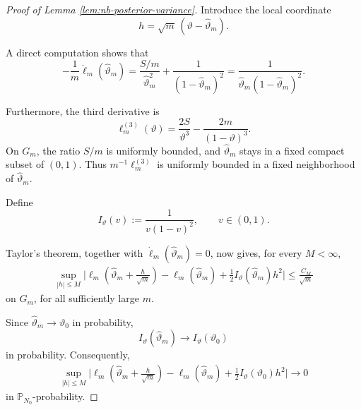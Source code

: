 \documentclass{article}
\theoremstyle{named}
\theoremstyle{named1}
\theoremstyle{plain}
\theoremstyle{remark}
\begin{document}
\begin{proof}[Proof of Lemma \ref{lem:nb-posterior-variance}]
Introduce the local coordinate
\[
    h=\sqrt m\,(\vartheta-\widehat\vartheta_m).
\]

A direct computation shows that
\begin{equation}
    -\frac1m\ddot\ell_m(\widehat\vartheta_m)
    =
    \frac{S/m}{\widehat\vartheta_m^2}
    +
    \frac{1}{(1-\widehat\vartheta_m)^2}
    =
    \frac{1}
    {\widehat\vartheta_m(1-\widehat\vartheta_m)^2}.
    \label{eq:nb-proof-observed-information}
\end{equation}


Furthermore, the third derivative is
\[
    \ell_m^{(3)}(\vartheta)
    =
    \frac{2S}{\vartheta^3}
    -
    \frac{2m}{(1-\vartheta)^3}.
\]
On \(G_m\), the ratio \(S/m\) is uniformly bounded, and
\(\widehat\vartheta_m\) stays in a fixed compact subset of
\((0,1)\). Thus \(m^{-1}\ell_m^{(3)}\) is uniformly bounded in a
fixed neighborhood of \(\widehat\vartheta_m\).

Define
\[
    I_\vartheta(v)
    :=
    \frac{1}{v(1-v)^2},
    \qquad v\in(0,1).
\]

Taylor's theorem, together with
\(\dot\ell_m(\widehat\vartheta_m)=0\), now gives, for every
\(M<\infty\),
\begin{equation}
\begin{split}
    \sup_{|h|\leq M}
    \bigg|
        \ell_m\left(
            \widehat\vartheta_m+\frac{h}{\sqrt m}
        \right)
        -
        \ell_m(\widehat\vartheta_m)
        +
        \frac12
        I_\vartheta(\widehat\vartheta_m)h^2
    \bigg|
    \leq
    \frac{C_M}{\sqrt m}
\end{split}
    \label{eq:nb-proof-local-taylor}
\end{equation}
on \(G_m\), for all sufficiently large \(m\).

Since \(\widehat\vartheta_m\to\vartheta_0\) in probability,
\[
    I_\vartheta(\widehat\vartheta_m)
    \rightarrow
    I_\vartheta(\vartheta_0)
\]
in probability. Consequently,
\begin{equation}
\begin{split}
    \sup_{|h|\leq M}
    \bigg|
        \ell_m\left(
            \widehat\vartheta_m+\frac{h}{\sqrt m}
        \right)
        -
        \ell_m(\widehat\vartheta_m)
        +
        \frac12 I_\vartheta(\vartheta_0)h^2
    \bigg|
    \rightarrow0
\end{split}
    \label{eq:nb-proof-local-gaussian-expansion}
\end{equation}
in \(\mathbb P_{N_0}\)-probability.



\end{proof}
\end{document}
